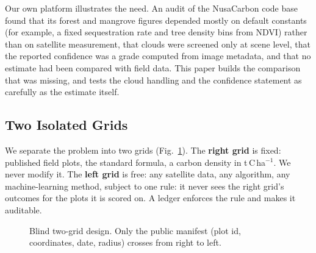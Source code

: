 \documentclass[conference,a4paper]{IEEEtran}
\begin{document}
Our own platform illustrates the need. An audit of the NusaCarbon code base found that its forest and mangrove figures depended mostly on default constants (for example, a fixed sequestration rate and tree density bins from NDVI) rather than on satellite measurement, that clouds were screened only at scene level, that the reported confidence was a grade computed from image metadata, and that no estimate had been compared with field data. This paper builds the comparison that was missing, and tests the cloud handling and the confidence statement as carefully as the estimate itself.

\subsection{Two Isolated Grids}
We separate the problem into two grids (Fig.~\ref{fig:grids}). The \textbf{right grid} is fixed: published field plots, the standard formula, a carbon density in t\,C\,ha$^{-1}$. We never modify it. The \textbf{left grid} is free: any satellite data, any algorithm, any machine-learning method, subject to one rule: it never sees the right grid's outcomes for the plots it is scored on. A ledger enforces the rule and makes it auditable.

\begin{figure}[t]
\centering
{}
\caption{Blind two-grid design. Only the public manifest (plot id, coordinates, date, radius) crosses from right to left.}
\label{fig:grids}
\end{figure}
\end{document}
